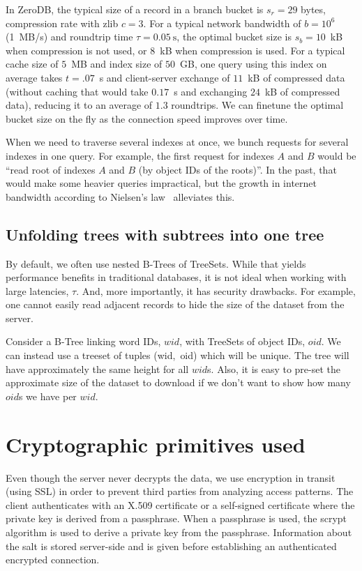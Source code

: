 \documentclass[notitlepage,longbibliography]{revtex4-1}
\begin{document}
In ZeroDB, the typical size of a record in a branch bucket is $s_r = 29$ bytes,
compression rate with zlib $c=3$.
For a typical network bandwidth of $b=10^6$ (1~MB/s) and roundtrip time $\tau=0.05~\mbox{s}$, the optimal bucket size is $s_b=10$~kB when compression is not used, or $8$~kB when compression is used.
For a typical cache size of $5$~MB and index size of $50$~GB,
one query using this index on average takes $t=.07$~s and client-server exchange of $11$~kB of compressed data (without caching that would take $0.17$~s and exchanging $24$~kB of compressed data), reducing it to an average of $1.3$ roundtrips.
We can finetune the optimal bucket size on the fly as the connection speed improves over time.

When we need to traverse several indexes at once, we bunch requests for several indexes in one query.
For example, the first request for indexes $A$ and $B$ would be ``read root of indexes $A$ and $B$ (by object IDs of the roots)''.
In the past, that would make some heavier queries impractical, but the growth in internet bandwidth according to Nielsen's law~\cite{nielsen-law} alleviates this.

\subsection{Unfolding trees with subtrees into one tree}
\label{sec:unfold-trees}

By default, we often use nested B-Trees of TreeSets.
While that yields performance benefits in traditional databases, it is not ideal when working with large latencies, $\tau$.
And, more importantly, it has security drawbacks.
For example, one cannot easily read adjacent records to hide the size of the dataset from the server.

Consider a B-Tree linking word IDs, $wid$, with TreeSets of object IDs, $oid$.
We can instead use a treeset of tuples (wid,~oid) which will be unique.
The tree will have approximately the same height for all $wid$s.
Also, it is easy to pre-set the approximate size of the dataset to download if we don't want to show how many $oid$s we have per $wid$.

\section{Cryptographic primitives used}

Even though the server never decrypts the data, we use encryption in transit (using SSL) in order to prevent third parties from analyzing access patterns.
The client authenticates with an X.509 certificate or a self-signed certificate where the private key is derived from a passphrase.
When a passphrase is used, the scrypt algorithm is used to derive a private key from the passphrase. Information about the salt is stored server-side and is given before establishing an authenticated encrypted connection.
\end{document}

